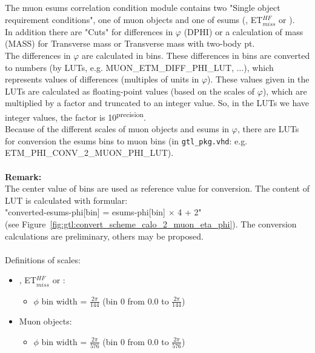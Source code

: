 The muon esums correlation condition module contains two "Single object requirement conditions", one of muon objects and one of esums (\etm, ET$_{miss}^{HF}$ or \htm).\\
In addition there are "Cuts" for differences in $\varphi$ (DPHI) or a calculation of mass (MASS) for Transverse mass or Transverse mass with two-body pt.\\
The differences in $\varphi$ are calculated in bins. These differences in bins are converted to numbers (by LUTs, e.g. \small{MUON\_ETM\_DIFF\_PHI\_LUT}\normalsize, ...),
which represents values of differences (multiples of units in $\varphi$).
These values given in the LUTs are calculated as floating-point values (based on the scales of $\varphi$), which are multiplied by a factor and truncated to an integer value.
So, in the LUTs we have integer values, the factor is 10\textsuperscript{\tiny{precision}\normalsize}.\\
Because of the different scales of muon objects and esums in $\varphi$, there are LUTs for conversion the esums bins to muon bins (in \texttt{gtl\_pkg.vhd}:
 e.g. \small{ETM\_PHI\_CONV\_2\_MUON\_PHI\_LUT}\normalsize).\\\\
\textbf{Remark:}\\
The center value of bins are used as reference value for conversion.
The content of LUT is calculated with formular:\\
"converted-esums-phi[bin] = esums-phi[bin] $\times$ 4 + 2"\\ (see Figure~\ref{fig:gtl:convert_scheme_calo_2_muon_eta_phi}).
The conversion calculations are preliminary, others may be proposed.\\\\
Definitions of scales:
\begin{itemize}
\item \etm, ET$_{miss}^{HF}$ or \htm:
\begin{itemize}
\item $\phi$ bin width = $\frac{2\pi}{144}$ (bin 0 from 0.0 to $\frac{2\pi}{144}$)
\end{itemize}
\item Muon objects:
\begin{itemize}
\item $\phi$ bin width = $\frac{2\pi}{576}$ (bin 0 from 0.0 to $\frac{2\pi}{576}$)
\end{itemize}
\end{itemize}

